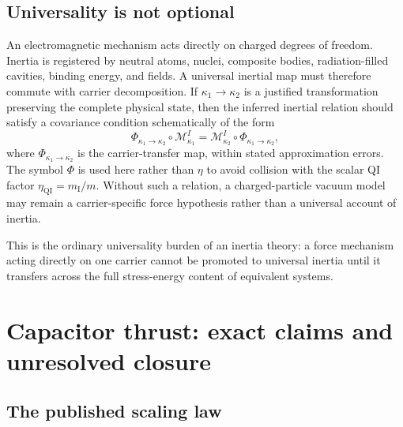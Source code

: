 \documentclass[11pt]{article}
\newcommand{\Carrier}{\kappa}
\newcommand{\QI}{\mathrm{QI}}
\newcommand{\Mcal}{\mathcal{M}}
\begin{document}
\subsection{Universality is not optional}

An electromagnetic mechanism acts directly on charged degrees of freedom. Inertia is registered by neutral atoms, nuclei, composite bodies, radiation-filled cavities, binding energy, and fields. A universal inertial map must therefore commute with carrier decomposition. If \(\Carrier_{1}\to\Carrier_{2}\) is a justified transformation preserving the complete physical state, then the inferred inertial relation should satisfy a covariance condition schematically of the form
\begin{equation}
    \Phi_{\Carrier_{1}\to\Carrier_{2}}\circ\Mcal^{I}_{\Carrier_{1}}
    =\Mcal^{I}_{\Carrier_{2}}\circ\Phi_{\Carrier_{1}\to\Carrier_{2}},
    \label{eq:carrier_covariance}
\end{equation}
where \(\Phi_{\Carrier_{1}\to\Carrier_{2}}\) is the carrier-transfer map, within stated approximation errors. The symbol \(\Phi\) is used here rather than \(\eta\) to avoid collision with the scalar QI factor \(\eta_{\QI}=m_{\mathrm I}/m\). Without such a relation, a charged-particle vacuum model may remain a carrier-specific force hypothesis rather than a universal account of inertia.

This is the ordinary universality burden of an inertia theory: a force mechanism acting directly on one carrier cannot be promoted to universal inertia until it transfers across the full stress-energy content of equivalent systems.

\section{Capacitor thrust: exact claims and unresolved closure}
\label{sec:capacitor}

\subsection{The published scaling law}
\end{document}
